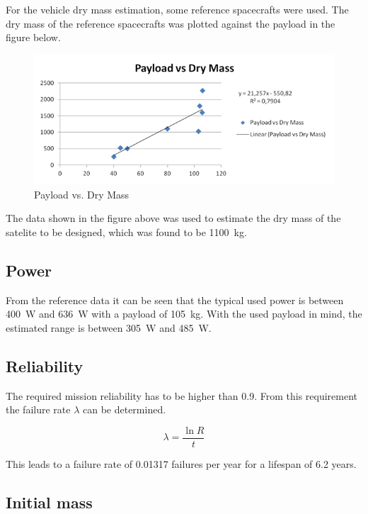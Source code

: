 For the vehicle dry mass estimation, some reference spacecrafts were
used. The dry mass of the reference spacecrafts was plotted against
the payload in the figure below.

\begin{figure}[h]
  \includegraphics[width=\textwidth]{Payload-vs-DryMass}
  \caption{Payload vs. Dry Mass}
\end{figure}

The data shown in the figure above was used to estimate the dry mass
of the satelite to be designed, which was found to be \SI{1100}{kg}.

\subsection{Power}
\label{sec:power}

From the reference data it can be seen that the typical used power is
between \SI{400}{W} and \SI{636}{W} with a payload of
\SI{105}{kg}. With the used payload in mind, the estimated range is
between \SI{305}{W} and \SI{485}{W}.

\subsection{Reliability}

The required mission reliability has to be higher than 0.9. From this
requirement the failure rate $\lambda$ can be determined.

\begin{equation}
  \lambda = \frac{\ln R}{t}
\end{equation}

This leads to a failure rate of 0.01317 failures per year for a
lifespan of 6.2 years.

\subsection{Initial mass}
\label{sec:initialmass}

